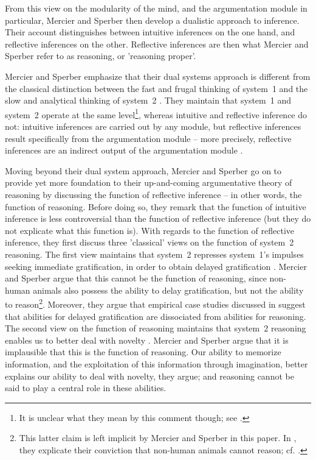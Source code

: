 From this view on the modularity of the mind, and the argumentation module in particular, Mercier and Sperber then develop a dualistic approach to inference.
Their account distinguishes between intuitive inferences on the one hand, and reflective inferences on the other. Reflective inferences are then what Mercier and Sperber refer to as reasoning, or 'reasoning proper'.

Mercier and Sperber emphasize that their dual systems approach is different from the classical distinction between the fast and frugal thinking of system~1 and the slow and analytical thinking of system~2 \citep[cf.][]{Kahneman11}. They maintain that system~1 and system~2 operate at the same level\footnote{It is unclear what they mean by this comment though; see \citet[p.~156]{MS09}.}, whereas intuitive and reflective inference do not: intuitive inferences are carried out by any module, but reflective inferences result specifically from the argumentation module -- more precisely, reflective inferences are an indirect output of the argumentation module \citep[p.~156]{MS09}.

Moving beyond their dual system approach, Mercier and Sperber go on to provide yet more foundation to their up-and-coming argumentative theory of reasoning by discussing the function of reflective inference -- in other words, the function of reasoning.
Before doing so, they remark that the function of intuitive inference is less controversial than the function of reflective inference (but they do not explicate what this function is).
With regards to the function of reflective inference, they first discuss three 'classical' views on the function of system~2 reasoning.
The first view maintains that system~2 represses system~1's impulses seeking immediate gratification, in order to obtain delayed gratification \citep{Sloman96}. Mercier and Sperber argue that this cannot be the function of reasoning, since non-human animals also possess the ability to delay gratification, but not the ability to reason\footnote{This latter claim is left implicit by Mercier and Sperber in this paper. In \citet[p.~57]{MS11}, they explicate their conviction that non-human animals cannot reason; cf. \citet{Hume39}.}.
Moreover, they argue that empirical case studies discussed in \citet{Damasio94} suggest that abilities for delayed gratification are dissociated from abilities for reasoning.
The second view on the function of reasoning maintains that system~2 reasoning enables us to better deal with novelty \citep{EvansOver1996}.
Mercier and Sperber argue that it is implausible that this is the function of reasoning. Our ability to memorize information, and the exploitation of this information through imagination, better explains our ability to deal with novelty, they argue; and reasoning cannot be said to play a central role in these abilities.

